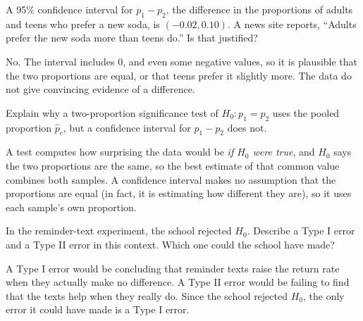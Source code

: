 \begin{Exercise}[title={Reading an Interval}, label=tp_read]
A 95\% confidence interval for $p_1 - p_2$, the difference in the proportions of adults and teens
who prefer a new soda, is $(-0.02, 0.10)$. A news site reports, ``Adults prefer the new soda more
than teens do.'' Is that justified?
\end{Exercise}
\begin{Answer}[ref=tp_read]
No. The interval includes 0, and even some negative values, so it is plausible that the two
proportions are equal, or that teens prefer it slightly more. The data do not give convincing
evidence of a difference.
\end{Answer}

\begin{Exercise}[title={To Pool or Not to Pool?}, label=tp_pool]
Explain why a two-proportion significance test of $H_0: p_1 = p_2$ uses the pooled proportion
$\hat{p}_c$, but a confidence interval for $p_1 - p_2$ does not.
\end{Exercise}
\begin{Answer}[ref=tp_pool]
A test computes how surprising the data would be \emph{if $H_0$ were true}, and $H_0$ says the two
proportions are the same, so the best estimate of that common value combines both samples. A
confidence interval makes no assumption that the proportions are equal (in fact, it is estimating
how different they are), so it uses each sample's own proportion.
\end{Answer}

\begin{Exercise}[title={What Could Go Wrong?}, label=tp_errors]
In the reminder-text experiment, the school rejected $H_0$. Describe a Type I error and a Type II
error in this context. Which one could the school have made?
\end{Exercise}
\begin{Answer}[ref=tp_errors]
A Type I error would be concluding that reminder texts raise the return rate when they actually
make no difference. A Type II error would be failing to find that the texts help when they really
do. Since the school rejected $H_0$, the only error it could have made is a Type I error.
\end{Answer}

